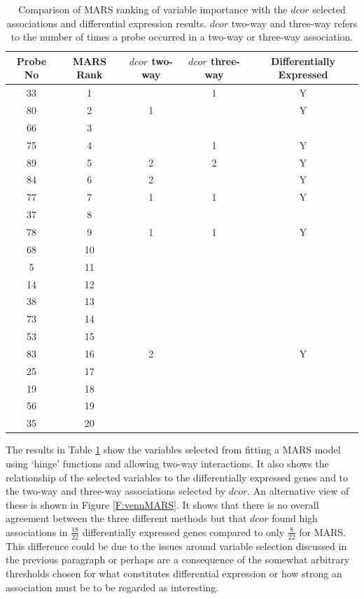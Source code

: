 \documentclass[a4paper, 12pt]{report}
\begin{document}
\begin{table}[H]
\begin{tabular}{ccccc}
  \hline
Probe No & MARS Rank & $dcor$ two-way & $dcor$ three-way & Differentially Expressed \\ 
  \hline
33 & 1  &  & 1 & Y \\ 
80 & 2  & 1 &  & Y \\ 
66 & 3  &  &  &  \\ 
75 & 4  &  & 1 & Y \\ 
89 & 5 & 2 & 2 & Y \\ 
84 & 6  & 2 &  & Y \\ 
 77 & 7  & 1 & 1 & Y \\ 
37 & 8  &  &  &  \\ 
 78 & 9  & 1 & 1 & Y \\ 
 68 & 10  &  &  &  \\ 
  5 & 11  &  &  &  \\ 
  14 & 12  &  &  &  \\ 
  38 & 13 &  &  &  \\ 
  73 & 14  &  &  &  \\ 
  53 & 15  &  &  &  \\ 
  83 & 16  & 2 &  & Y \\ 
  25 & 17 &  &  &  \\ 
  19 & 18  &  &  &  \\ 
  56 & 19 &  &  &  \\ 
  35 & 20  &  &  &  \\ 
   \hline
\end{tabular}
\caption{Comparison of MARS ranking of variable importance with the $dcor$ selected associations and differential expression results. $dcor$ two-way and three-way refers to the number of times a probe occurred in a two-way or three-way association.} 
\label{T:MARS}
\end{table}

The results in Table \ref{T:MARS} show the variables selected from fitting a MARS model using `hinge' functions and allowing two-way interactions. It also shows the relationship of the selected variables to the differentially expressed genes and to the two-way and three-way associations selected by $dcor$. An alternative view of these is shown in Figure \ref{F:vennMARS}. It shows that there is no overall agreement between the three different methods but that $dcor$ found high associations in $\frac{18}{22}$ differentially expressed genes compared to only $\frac{8}{22}$ for MARS. This difference could be due to the issues around variable selection discussed in the previous paragraph or perhaps are a consequence of the somewhat arbitrary thresholds chosen for what constitutes differential expression or how strong an association must be to be regarded as interesting. 
\end{document}
